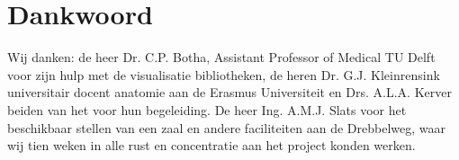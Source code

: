 \section{Dankwoord}
\label{Dankwoord}
Wij danken: de heer Dr. C.P. Botha, Assistant Professor of Medical TU Delft voor zijn hulp met de visualisatie bibliotheken, de heren Dr. G.J. Kleinrensink universitair docent anatomie aan de Erasmus Universiteit en Drs. A.L.A. Kerver beiden van het \casamproject voor hun begeleiding. De heer Ing. A.M.J. Slats voor het beschikbaar stellen van een zaal en andere faciliteiten aan de Drebbelweg, waar wij tien weken in alle rust en concentratie aan het project konden werken.

